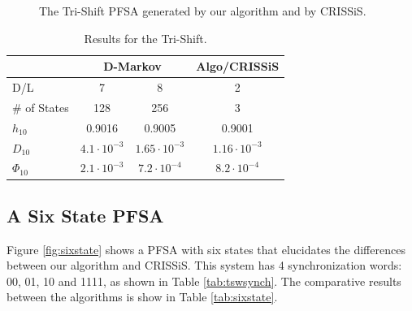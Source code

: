 {\begin{figure}
\centering
{}
\caption{The Tri-Shift PFSA generated by our algorithm and by CRISSiS.\label{fig:trishiftgen}}
\end{figure}

\begin{table}
\centering
\begin{tabular}{|l|c|c|c|}
\hline
 & \multicolumn{2}{c|}{\textbf{D-Markov}} & \textbf{Algo/CRISSiS}\\
 \hline
D/L & 7 & 8 & 2 \\
\hline
\# of States & 128 & 256 & 3 \\ 
$h_{10}$ & 0.9016 & 0.9005 & 0.9001 \\
$D_{10}$ & $4.1\cdot10^{-3}$ & $1.65\cdot10^{-3}$ & $1.16\cdot10^{-3}$ \\
$\Phi_{10}$ & $2.1\cdot10^{-3}$ & $7.2\cdot10^{-4}$ & $8.2\cdot10^{-4}$ \\
 \hline
\end{tabular}
\caption{Results for the Tri-Shift. \label{tab:trishift}}
\end{table}

\subsection{A Six State PFSA}

Figure \ref{fig:sixstate} shows a PFSA with six states that elucidates the differences between our algorithm and CRISSiS. This system has 4 synchronization words: 00, 01, 10 and 1111, as shown in Table \ref{tab:tswsynch}. The comparative results between the algorithms is show in Table \ref{tab:sixstate}.

}
